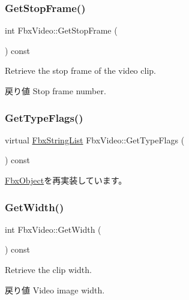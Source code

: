 \subsubsection{\texorpdfstring{Get\+Stop\+Frame()}{GetStopFrame()}}
{\footnotesize\ttfamily int Fbx\+Video\+::\+Get\+Stop\+Frame (\begin{DoxyParamCaption}{ }\end{DoxyParamCaption}) const}

Retrieve the stop frame of the video clip. \begin{DoxyReturn}{戻り値}
Stop frame number. 
\end{DoxyReturn}
\mbox{\label{class_fbx_video_a69adf09a2346176545e330cd2c8f23ad}} 
\subsubsection{\texorpdfstring{Get\+Type\+Flags()}{GetTypeFlags()}}
{\footnotesize\ttfamily virtual \hyperlink{class_fbx_string_list}{Fbx\+String\+List} Fbx\+Video\+::\+Get\+Type\+Flags (\begin{DoxyParamCaption}{ }\end{DoxyParamCaption}) const\hspace{0.3cm}{\ttfamily [virtual]}}



\hyperlink{class_fbx_object_a6d30a5d00400039a248977cf9f9255b2}{Fbx\+Object}を再実装しています。

\mbox{\label{class_fbx_video_a9ad08f6d0da0e76353dc6250f1321093}} 
\subsubsection{\texorpdfstring{Get\+Width()}{GetWidth()}}
{\footnotesize\ttfamily int Fbx\+Video\+::\+Get\+Width (\begin{DoxyParamCaption}{ }\end{DoxyParamCaption}) const}

Retrieve the clip width. \begin{DoxyReturn}{戻り値}
Video image width. 
\end{DoxyReturn}
\mbox{\label{class_fbx_video_a71d943f108e39aa4bdec2a55d7d2468a}} 
